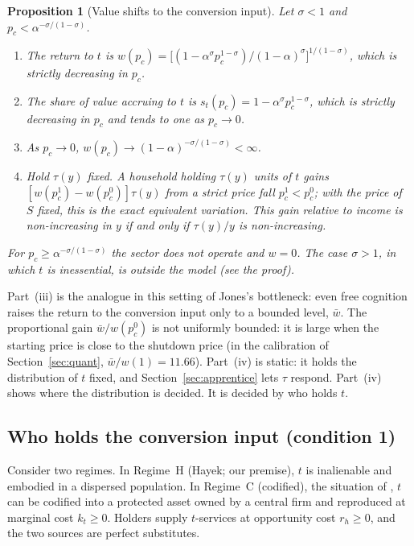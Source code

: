 \documentclass[12pt]{article}
\newtheorem{proposition}{Proposition}
\theoremstyle{remark}
\begin{document}
\begin{proposition}[Value shifts to the conversion input]\label{prop:valueshift}
Let $\sigma<1$ and $p_c<\alpha^{-\sigma/(1-\sigma)}$.
\begin{enumerate}[label=(\roman*),itemsep=0pt]
\item The return to $t$ is $w(p_c)=\big[(1-\alpha^\sigma p_c^{1-\sigma})/(1-\alpha)^\sigma\big]^{1/(1-\sigma)}$, which is strictly decreasing in $p_c$.
\item The share of value accruing to $t$ is $s_t(p_c)=1-\alpha^\sigma p_c^{1-\sigma}$, which is strictly decreasing in $p_c$ and tends to one as $p_c\to0$.
\item As $p_c\to0$, $w(p_c)\to(1-\alpha)^{-\sigma/(1-\sigma)}<\infty$.
\item Hold $\tau(y)$ fixed. A household holding $\tau(y)$ units of $t$ gains $[w(p_c^1)-w(p_c^0)]\tau(y)$ from a strict price fall $p_c^1<p_c^0$; with the price of $S$ fixed, this is the exact equivalent variation. This gain relative to income is non-increasing in $y$ if and only if $\tau(y)/y$ is non-increasing.
\end{enumerate}
For $p_c\ge\alpha^{-\sigma/(1-\sigma)}$ the sector does not operate and $w=0$. The case $\sigma>1$, in which $t$ is inessential, is outside the model (see the proof).
\end{proposition}

Part~(iii) is the analogue in this setting of Jones's bottleneck: even free cognition raises the return to the conversion input only to a bounded level, $\bar w$. The proportional gain $\bar w/w(p_c^0)$ is not uniformly bounded: it is large when the starting price is close to the shutdown price (in the calibration of Section~\ref{sec:quant}, $\bar w/w(1)=11.66$). Part~(iv) is static: it holds the distribution of $t$ fixed, and Section~\ref{sec:apprentice} lets $\tau$ respond. Part~(iv) shows where the distribution is decided. It is decided by who holds $t$.

\subsection{Who holds the conversion input (condition 1)}\label{sec:regime}

Consider two regimes. In Regime~H (Hayek; our premise), $t$ is inalienable and embodied in a dispersed population. In Regime~C (codified), the situation of \citet[\S12.4.3]{brynjolfsson2026hayek}, $t$ can be codified into a protected asset owned by a central firm and reproduced at marginal cost $k_t\ge0$. Holders supply $t$-services at opportunity cost $r_h\ge0$, and the two sources are perfect substitutes.
\end{document}
